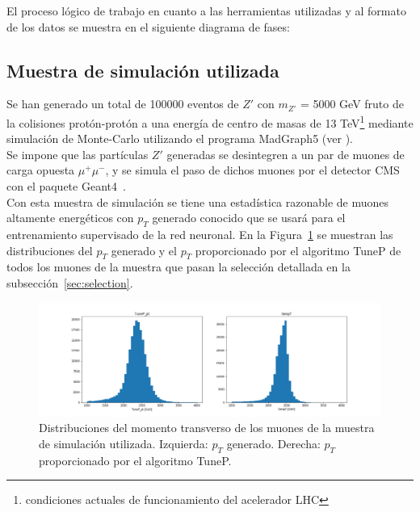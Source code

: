 El proceso l\'ogico de trabajo en cuanto a las herramientas utilizadas y al formato de los datos se muestra en el siguiente diagrama de fases: 

\begin{center}
\end{center}


\subsection{Muestra de simulaci\'on utilizada}\label{sec:sample}

Se han generado un total de 100000 eventos de $Z'$ con $m_{Z'}$ = 5000 GeV fruto de la colisiones prot\'on-prot\'on a una energ\'ia de centro de masas de 13 TeV\footnote{condiciones actuales de funcionamiento del acelerador LHC} mediante simulaci\'on de Monte-Carlo utilizando el programa MadGraph5 (ver \cite{generator}). \\
Se impone que las part\'iculas $Z'$ generadas se desintegren a un par de muones de carga opuesta $\mu^{+}\mu^{-}$, y se simula el paso de dichos muones por el detector CMS con el paquete Geant4~\cite{Agostinelli:2002hh}. \\

Con esta muestra de simulaci\'on se tiene una estad\'istica razonable de muones altamente energ\'eticos con $p_{T}$ generado conocido que se usar\'a para el entrenamiento supervisado de la red neuronal. En la Figura~\ref{fig:data_pt} se muestran las distribuciones del $p_{T}$ generado y el $p_{T}$ proporcionado por el algoritmo TuneP de todos los muones de la muestra que pasan la selecci\'on detallada en la subsecci\'on~\ref{sec:selection}.

\begin{figure}[h]
\centering
\includegraphics[width=1.0\textwidth]{figures/data_pt.png}
\caption{Distribuciones del momento transverso de los muones de la muestra de simulaci\'on utilizada. Izquierda: $p_{T}$ generado. Derecha: $p_{T}$ proporcionado por el algoritmo TuneP.}
\label{fig:data_pt}        
\end{figure}


